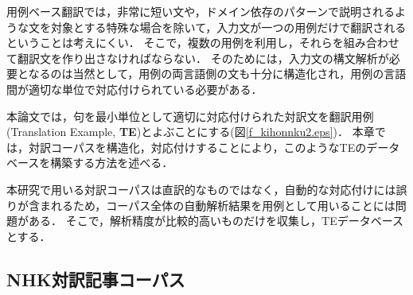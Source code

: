 \documentclass{nlp}
\begin{document}
用例ベース翻訳では，非常に短い文や，ドメイン依存のパターンで説明されるような文を対象とする特殊な場合を除いて，入力文が一つの用例だけで翻訳されるということは考えにくい．
そこで，複数の用例を利用し，それらを組み合わせて翻訳文を作り出さなければならない．
そのためには，入力文の構文解析が必要となるのは当然として，用例の両言語側の文も十分に構造化され，用例の言語間が適切な単位で対応付けられている必要がある．

本論文では，句を最小単位として適切に対応付けられた対訳文を翻訳用例(Translation Example, \textbf{TE})とよぶことにする(図\ref{f_kihonnku2.eps})．
本章では，対訳コーパスを構造化，対応付けすることにより，このようなTEのデータベースを構築する方法を述べる．

本研究で用いる対訳コーパスは直訳的なものではなく，自動的な対応付けには誤りが含まれるため，コーパス全体の自動解析結果を用例として用いることには問題がある．
そこで，解析精度が比較的高いものだけを収集し，TEデータベースとする．

\subsection{NHK対訳記事コーパス}
\end{document}
